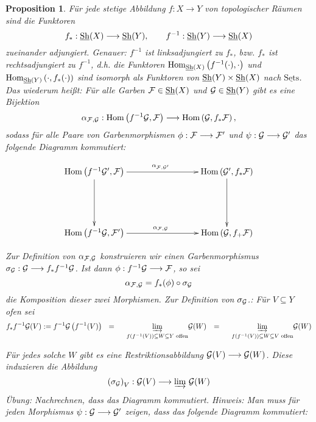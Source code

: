 \documentclass[11pt]{book}
\newtheorem{proposition}[theorem]{Proposition}
\theoremstyle{nonumberbreak}
\newenvironment{pr}[1][]{\ifthenelse{\equal{#1}{}}{\proof}{\proof[#1]}\rm}{\endproof}
\newenvironment{bemdefin}[1][]{\ifthenelse{\equal{#1}{}}{\bemdefini}{\bemdefini[#1]}\rm}{\endbemdefini}
\newcommand{\Hom}{\mathrm{Hom} }
\newcommand{\sets}{\underline{\mathrm{Sets}}}
\begin{document}
\begin{spacing}{1.4}
\begin{bemdefin}
\end{bemdefin}




\begin{proposition}  %
Für jede stetige Abbildung $f: X \longrightarrow Y$ von topologischer Räumen sind die Funktoren
$$f_{*}: \underline{\mathrm{Sh}}(X) \longrightarrow \underline{\mathrm{Sh}}(Y),  \qquad f^{-1}: \underline{\mathrm{Sh}}(Y) \longrightarrow \underline{\mathrm{Sh}}(X)$$
zueinander adjungiert. Genauer: $f^{-1}$ ist linksadjungiert zu $f_*$, bzw. $f_*$ ist rechtsadjungiert zu $f^{-1}$, d.h. die Funktoren $\Hom_{\underline{\rm{Sh}}(X)}\left( f^{-1}(\cdot), \cdot\right)$ und $\Hom_{\garben(Y)}\left(\cdot, f_{*}(\cdot)\right)$ sind isomorph als Funktoren von $\underline{\mathrm{Sh}}(Y) \times \underline{\mathrm{Sh}}(X)$ nach $\sets$. Das wiederum heißt: Für alle Garben $\mathcal{F} \in \underline{\mathrm{Sh}}(X)$ und $\mathcal{G} \in \underline{\mathrm{Sh}}(Y)$ gibt es eine Bijektion
$$\alpha_{\F, \G}: \Hom\left(f^{-1}\mathcal{G}, \F \right) \longrightarrow \Hom\left( \G, f_* \F\right),$$
sodass für alle Paare von Garbenmorphismen $\phi: \mathcal{F} \longrightarrow \mathcal{F}'$ und $\psi: \mathcal{G} \longrightarrow \mathcal{G}'$ das folgende Diagramm kommutiert:

$$
\begin{xy}
\xymatrix{
\Hom\left(f^{-1}\mathcal{G}', \mathcal{F} \right) \ar[rrr]^{\alpha_{\F, \G'}} \ar[dd]^{} &&& \Hom \left(\mathcal{G}', f_*\mathcal{F}\right) \ar[dd]^{} \\
&&& \\
\Hom\left(f^{-1}\mathcal{G}, \mathcal{F}'\right) \ar[rrr]^{\alpha_{\F, \G}} &&& \Hom\left(\G, f_+\F\right)
}
\end{xy}
$$

\begin{pr}
Zur Definition von $\alpha_{\mathcal{F}, \mathcal{G}}$ konstruieren wir einen Garbenmorphismus $\sigma_{\mathcal{G}}: \mathcal{G} \longrightarrow f_* f^{-1} \mathcal{G}$. Ist dann $\phi: f^{-1} \mathcal{G} \longrightarrow \mathcal{F}$, so sei 
$$\alpha_{\mathcal{F}, \mathcal{G}} = f_*(\phi) \circ \sigma_{\mathcal{G}}$$
die Komposition dieser zwei Morphismen. Zur Definition von $\sigma_{\mathcal{G}}$.: Für $V \subseteq Y$ ofen sei
\setlength{\abovedisplayskip}{5.5pt}
\setlength{\belowdisplayskip}{5.5pt}
\begin{alignat*}{5}
f_* f^{-1} \G(V) := f^{-1} \G \left(f^{-1}(V) \right) \ \ &=&& \ \ \underset{f(f^{-1}(V)) \subseteq W \subseteq Y \textrm{ offen}}{\underrightarrow{\textrm{lim}}} \mathcal{G}(W)
&=&& \ \ \underset{f(f^{-1}(V)) \subseteq W \subseteq V \textrm{ offen}}{\underrightarrow{\textrm{lim}}} \mathcal{G}(W)
\end{alignat*}

Für jedes solche $W$ gibt es eine Restriktionsabbildung $\mathcal{G}(V) \longrightarrow \mathcal{G}(W)$. Diese induzieren die Abbildung
$$\left(\sigma_{\mathcal{G}}\right)_V: \mathcal{G}(V) \longrightarrow \underrightarrow{\textrm{lim}}\  \mathcal{G}(W)$$
Übung: Nachrechnen, dass das Diagramm kommutiert.
Hinweis: Man muss für jeden Morphismus $\psi: \mathcal{G} \longrightarrow \mathcal{G}'$ zeigen, dass das folgende Diagramm kommutiert:


\end{pr}
\end{proposition}
\end{spacing}
\end{document}
